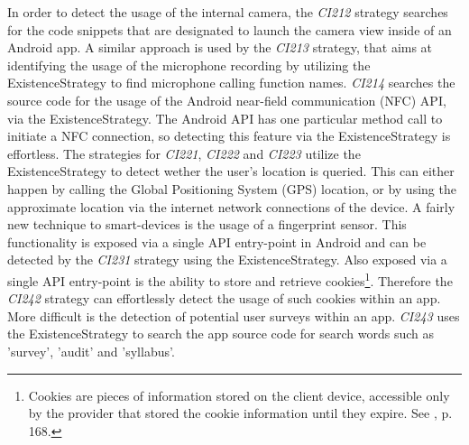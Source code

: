 In order to detect the usage of the internal camera, the \textit{CI212} strategy searches for the code snippets that are designated to launch the camera view inside of an Android app.
A similar approach is used by the \textit{CI213} strategy, that aims at identifying the usage of the microphone recording by utilizing the ExistenceStrategy to find microphone calling function names.
\textit{CI214} searches the source code for the usage of the Android near-field communication (\acs{NFC}) API, via the ExistenceStrategy.
The Android API has one particular method call to initiate a NFC connection, so detecting this feature via the ExistenceStrategy is effortless.
The strategies for \textit{CI221}, \textit{CI222} and \textit{CI223} utilize the ExistenceStrategy to detect wether the user's location is queried.
This can either happen by calling the Global Positioning System (\acs{GPS}) location, or by using the approximate location via the internet network connections of the device.
A fairly new technique to smart-devices is the usage of a fingerprint sensor. 
This functionality is exposed via a single API entry-point in Android and can be detected by the \textit{CI231} strategy using the ExistenceStrategy.
Also exposed via a single API entry-point is the ability to store and retrieve cookies\footnote{Cookies are pieces of information stored on the client device, accessible only by the provider that stored the cookie information until they expire. See \cite{Laudon2010}, p. 168.}.
Therefore the \textit{CI242} strategy can effortlessly detect the usage of such cookies within an app.
More difficult is the detection of potential user surveys within an app.
\textit{CI243} uses the ExistenceStrategy to search the app source code for search words such as 'survey', 'audit' and 'syllabus'.


